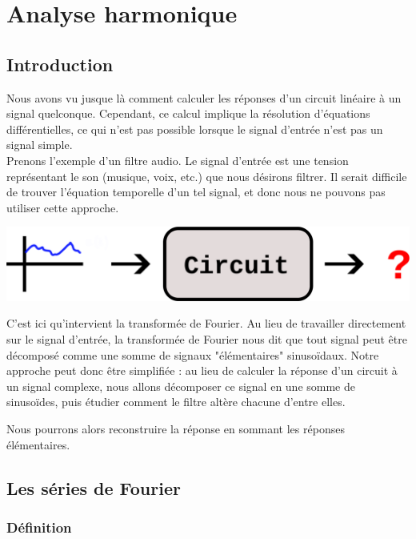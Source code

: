 \chapter{Analyse harmonique}
\section{Introduction}

Nous avons vu jusque là comment calculer les réponses d'un circuit linéaire à un signal quelconque. Cependant, ce calcul implique la résolution d'équations différentielles, ce qui n'est pas possible lorsque le signal d'entrée n'est pas un signal simple. \\

Prenons l'exemple d'un filtre audio. Le signal d'entrée est une tension représentant le son (musique, voix, etc.) que nous désirons filtrer. Il serait difficile de trouver l'équation temporelle d'un tel signal, et donc nous ne pouvons pas utiliser cette approche. 

\begin{center}
\includegraphics{part01/chap06/intro01.png}
\end{center}

C'est ici qu'intervient la transformée de Fourier. Au lieu de travailler directement sur le signal d'entrée, la transformée de Fourier nous dit que tout signal peut être décomposé comme une somme de signaux "élémentaires" sinusoïdaux. Notre approche peut donc être simplifiée : au lieu de calculer la réponse d'un circuit à un signal complexe, nous allons décomposer ce signal en une somme de sinusoïdes, puis étudier comment le filtre altère chacune d'entre elles. 

\begin{center}

\end{center}

Nous pourrons alors reconstruire la réponse en sommant les réponses élémentaires. 

\pagebreak
\section{Les séries de Fourier}

\subsection*{Définition}

